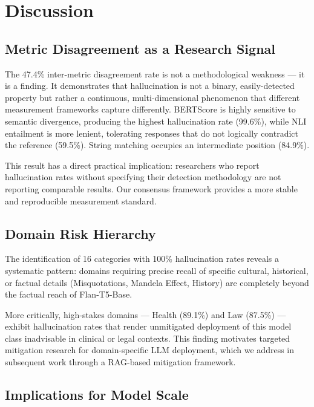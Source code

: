\documentclass[conference]{IEEEtran}
\begin{document}
\section{Discussion}
\label{sec:discussion}

\subsection{Metric Disagreement as a Research Signal}

The 47.4\% inter-metric disagreement rate is not a
methodological weakness — it is a finding.
It demonstrates that hallucination is not a binary,
easily-detected property but rather a continuous,
multi-dimensional phenomenon that different measurement
frameworks capture differently.
BERTScore is highly sensitive to semantic divergence,
producing the highest hallucination rate (99.6\%),
while NLI entailment is more lenient, tolerating responses
that do not logically contradict the reference (59.5\%).
String matching occupies an intermediate position (84.9\%).

This result has a direct practical implication:
researchers who report hallucination rates without
specifying their detection methodology are not reporting
comparable results.
Our consensus framework provides a more stable and
reproducible measurement standard.

\subsection{Domain Risk Hierarchy}

The identification of 16 categories with 100\% hallucination
rates reveals a systematic pattern: domains requiring
precise recall of specific cultural, historical, or
factual details (Misquotations, Mandela Effect, History)
are completely beyond the factual reach of Flan-T5-Base.

More critically, high-stakes domains — Health (89.1\%)
and Law (87.5\%) — exhibit hallucination rates that
render unmitigated deployment of this model class
inadvisable in clinical or legal contexts.
This finding motivates targeted mitigation research
for domain-specific LLM deployment, which we address
in subsequent work through a RAG-based mitigation
framework.

\subsection{Implications for Model Scale}
\end{document}
